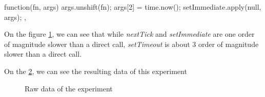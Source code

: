\documentclass{article}
\begin{document}
\begin{code}[Javascript, caption={\textit{setImmediate}},label={lst:immediate}]  
function(fn, args) {
  args.unshift(fn);
  args[2] = time.now();
  setImmediate.apply(null, args);
},
\end{code}

On the figure \ref{fig:plot}, we can see that while \textit{nextTick} and \textit{setImmediate} are one order of magnitude slower than a direct call, \textit{setTimeout} is about 3 order of magnitude slower than a direct call.  

\begin{figure}
  
\label{fig:plot}
\end{figure}

On the \ref{fig:data}, we can see the resulting data of this experiment

\begin{figure}

\label{fig:data}
\caption{Raw data of the experiment}
\end{figure}
\end{document}
